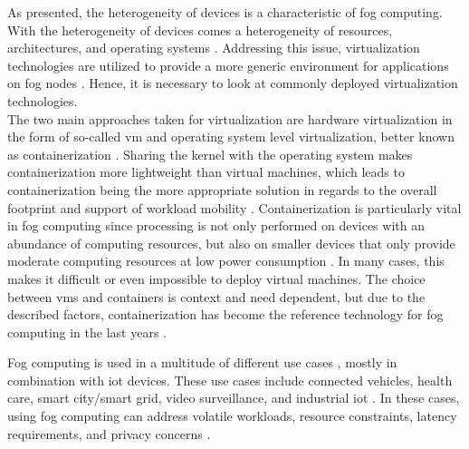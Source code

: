 As presented, the heterogeneity of devices is a characteristic of fog computing. With the heterogeneity of devices comes a heterogeneity of resources, architectures, and operating systems \cite{Puliafito.2019}. Addressing this issue, virtualization technologies are utilized to provide a more generic environment for applications on fog nodes \cite{Puliafito.2019}. Hence, it is necessary to look at commonly deployed virtualization technologies.\\
The two main approaches taken for virtualization are hardware virtualization in the form of so-called \gls{vm} and operating system level virtualization, better known as containerization \cite{Puliafito.2019}. Sharing the kernel with the operating system makes containerization more lightweight than virtual machines, which leads to containerization being the more appropriate solution in regards to the overall footprint and support of workload mobility \cite{Puliafito.2019}. Containerization is particularly vital in fog computing since processing is not only performed on devices with an abundance of computing resources, but also on smaller devices that only provide moderate computing resources at low power consumption \cite{Jalali.2016}. In many cases, this makes it difficult or even impossible to deploy virtual machines. The choice between \gls{vm}s and containers is context and need dependent, but due to the described factors, containerization has become the reference technology for fog computing in the last years \cite{Puliafito.2018}.\par

Fog computing is used in a multitude of different use cases \cite{Yousefpour.2019}, mostly in combination with \gls{iot} devices. These use cases include connected vehicles, health care, smart city/smart grid, video surveillance, and industrial \gls{iot} \cite{Yousefpour.2019}. In these cases, using fog computing can address volatile workloads, resource constraints, latency requirements, and privacy concerns \cite{Yigitoglu.2017}.


